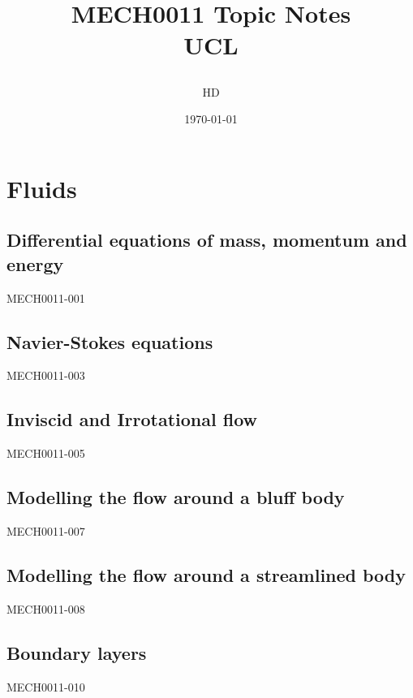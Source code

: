 \documentclass[12pt,a4paper, twoside]{report}
\begin{document}
\title{
  {MECH0011 Topic Notes}\\
  {\large UCL}
  \author{HD}
  \date{\today}
}
\maketitle
\tableofcontents
\part{Fluids}
\chapter{Differential equations of mass, momentum and energy}
{MECH0011-001}
\chapter{Navier-Stokes equations}
{MECH0011-003}
\chapter{Inviscid and Irrotational flow}
{MECH0011-005}
\chapter{Modelling the flow around a bluff body}
{MECH0011-007}
\chapter{Modelling the flow around a streamlined body}
{MECH0011-008}
\chapter{Boundary layers}
{MECH0011-010}
\end{document}

